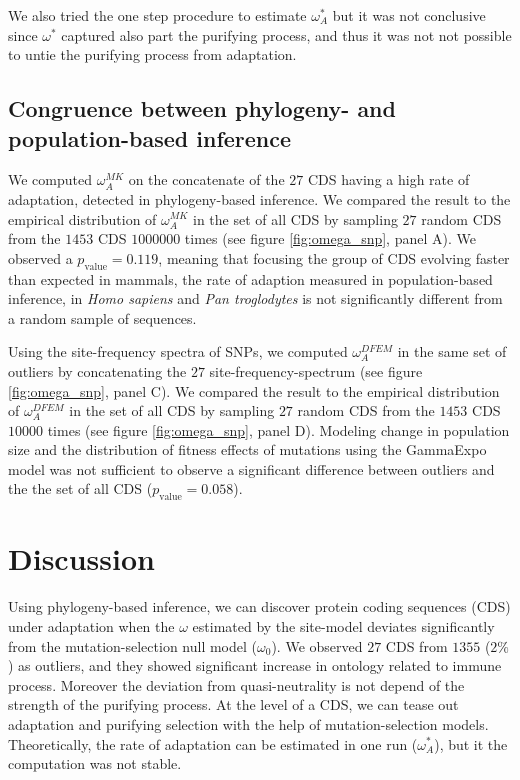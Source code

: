 \documentclass[10pt]{article}
\begin{document}
\begin{multicols}{2}
	
	We also tried the one step procedure to estimate $\omega_A^*$ but it was not conclusive since $\omega^*$ captured also part the purifying process, and thus it was not not possible to untie the purifying process from adaptation. 
	

	\subsection*{Congruence between phylogeny- and population-based inference}
	We computed $\omega_A^{MK}$ on the concatenate of the $27$ CDS having a high rate of adaptation, detected in phylogeny-based inference. We compared the result to the empirical distribution of $\omega_A^{MK}$ in the set of all CDS by sampling $27$ random CDS from the $1453$ CDS $1000000$ times (see figure \ref{fig:omega_snp}, panel A).
	We observed a $p_{\mathrm{value}}=0.119$, meaning that focusing the group of CDS evolving faster than expected in mammals, the rate of adaption measured in population-based inference, in \textit{Homo sapiens} and \textit{Pan troglodytes} is not significantly different from a random sample of sequences.
	
	Using the site-frequency spectra of SNPs, we computed $\omega_A^{DFEM}$ in the same set of outliers by concatenating the $27$ site-frequency-spectrum (see figure \ref{fig:omega_snp}, panel C). We compared the result to the empirical distribution of $\omega_A^{DFEM}$ in the set of all CDS by sampling $27$ random CDS from the $1453$ CDS $10000$ times (see figure \ref{fig:omega_snp}, panel D). Modeling change in population size and the distribution of fitness effects of mutations using the GammaExpo model was not sufficient to observe a significant difference between outliers and the the set of all CDS ($p_{\mathrm{value}}=0.058$).
	
	\section*{Discussion}
	Using phylogeny-based inference, we can discover protein coding sequences (CDS) under adaptation when the $\omega$ estimated by the site-model deviates significantly from the mutation-selection null model ($\omega_0$). We observed $27$ CDS from $1355$ ($2\%$) as outliers, and they showed significant increase in ontology related to immune process. Moreover the deviation from quasi-neutrality is not depend of the strength of the purifying process. At the level of a CDS, we can tease out adaptation and purifying selection with the help of mutation-selection models. Theoretically, the rate of adaptation can be estimated in one run ($\omega_A^*$), but it the computation was not stable.\\
	

\end{multicols}
\end{document}
